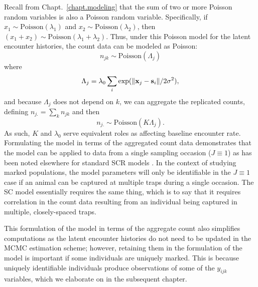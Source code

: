 Recall from Chapt.~\ref{chapt.modeling} that the sum of two or more
Poisson random variables is also a Poisson random variable.
Specifically,
if $x_1 \sim \text{Poisson}(\lambda_1)$ and
$x_2 \sim \text{Poisson}(\lambda_2)$, then $(x_1+x_2) \sim
\text{Poisson}(\lambda_1 + \lambda_2)$. Thus,
under this Poisson model for the latent encounter histories,
the count data can be modeled as Poisson:
\begin{equation}
n_{jk} \sim \mbox{Poisson}( \Lambda_{j} )
\label{eq:nagg}
\end{equation}
where
\[
 \Lambda_{j} = \lambda_0 \sum_{i} \exp(\| {\bf x}_j - {\bf s}_i \| / 2\sigma^2),
\]
and because $\Lambda_j$ does not depend on $k$, we can
aggregate the replicated counts, defining
$n_{j.} = \sum_{k} n_{jk}$ and then
\[
 n_{j.} \sim \mbox{Poisson}( K \Lambda_{j} ).
\]
As such, $K$ and $\lambda_{0}$ serve equivalent roles as affecting
baseline encounter rate.
Formulating the model in terms of the aggregated count data
demonstrates that the model can be
applied to data from a single sampling occasion ($J \equiv 1$) as has
been noted elsewhere for standard SCR models
\citep{efford_etal:2009ecol}. In the context of studying marked
populations, the model parameters will only be identifiable in the
$J\equiv 1$ case if an animal can be captured at multiple traps during
a single occasion. The SC model essentially requires the same thing,
which is to say that it requires correlation in the count data
resulting from an individual being captured in multiple,
closely-spaced traps.

This formulation of the model in terms of the aggregate count also
simplifies computations as the latent encounter histories
do not need to be updated in the MCMC estimation
scheme; however, retaining them in the formulation of the model
is important if some individuals are uniquely marked. %
This is because
uniquely identifiable individuals produce
observations of some of the $y_{ijk}$ variables, which we elaborate
on in the subsequent chapter.




